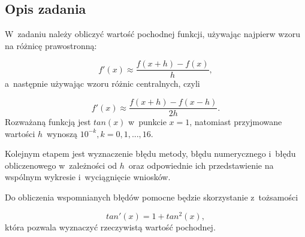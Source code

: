 \subsection{Opis zadania}

\quad W~zadaniu należy obliczyć wartość pochodnej funkcji, używając najpierw wzoru na różnicę prawostronną:

\begin{equation}
	f'(x) \approx \frac{f(x+h)-f(x)}{h},
	\label{zad1:eqn1}
\end{equation}
a~następnie używając wzoru różnic centralnych, czyli

\begin{equation}
	f'(x) \approx \frac{f(x+h)-f(x-h)}{2h}.
	\label{zad1:eqn2}
\end{equation}
Rozważaną funkcją jest $tan(x)$ w~punkcie $x=1$, natomiast przyjmowane wartości $h$~wynoszą $10^{-k}, k=0,1,...,16$.

Kolejnym etapem jest wyznaczenie błędu metody, błędu numerycznego i~błędu obliczenowego w~zależności od $h$~oraz odpowiednie ich przedstawienie na wspólnym wykresie i~wyciągnięcie wniosków.

Do obliczenia wspomnianych błędów pomocne będzie skorzystanie z~tożsamości 

\begin{equation}
	tan'(x)=1+tan^2(x),
	\label{zad1:eqn3} 
\end{equation}
która pozwala wyznaczyć rzeczywistą wartość pochodnej.
